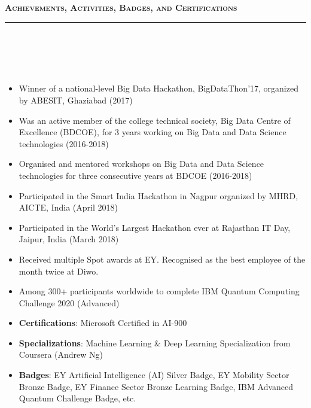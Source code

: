 \documentclass[a4paper,10pt]{article}
\newcommand{\isep}{-2 pt}
\newcommand{\lsep}{-0.5cm}
\newcommand{\resheading}[1]{{\small
        {
            \begin{minipage}
                {0.992\textwidth}\textbf{{\textsc{#1 \vphantom{p\^{E}} }}}
                \\[-0.3cm]
                \hrule
            \end{minipage}
            \\[-0.5cm]
        }
 }}
\begin{document}
\noindent
\resheading{\textbf{\large Achievements, Activities, Badges, and Certifications}}\\[\lsep] 
\\[-0.3cm]
\begin{itemize}\itemsep \isep

\item Winner of a national-level Big Data Hackathon, BigDataThon’17, organized by ABESIT, Ghaziabad (2017)

\item Was an active member of the college technical society, Big Data Centre of Excellence (BDCOE), for 3 years working on Big Data and Data Science technologies (2016-2018)

\item Organised and mentored workshops on Big Data and Data Science technologies for three consecutive years at BDCOE (2016-2018)

\item Participated in the Smart India Hackathon in Nagpur organized by MHRD, AICTE, India (April 2018)

\item Participated in the World's Largest Hackathon ever at Rajasthan IT Day, Jaipur, India (March 2018)

\item Received multiple Spot awards at EY. Recognised as the best employee of the month twice at Diwo.

\item Among 300+ participants worldwide to complete IBM Quantum Computing Challenge 2020 (Advanced)

\item \textbf{Certifications}: Microsoft Certified in AI-900
\item \textbf{Specializations}: Machine Learning \& Deep Learning Specialization from Coursera (Andrew Ng)
\item \textbf{Badges}: EY Artificial Intelligence (AI) Silver Badge, EY Mobility Sector Bronze Badge, EY Finance Sector Bronze Learning Badge, IBM Advanced Quantum Challenge Badge, etc.
    
	
\end{itemize}
\end{document}
